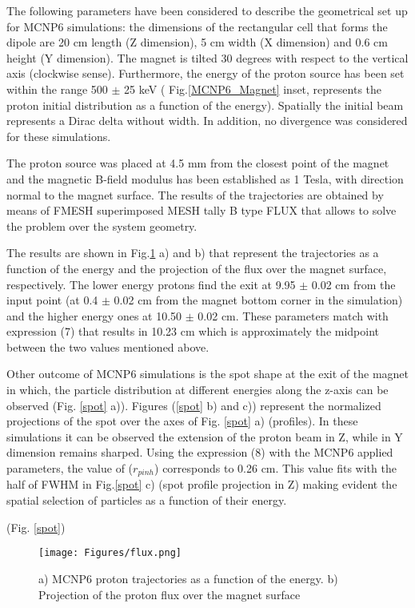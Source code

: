 \documentclass{cup-hpl}
\begin{document}
The following parameters have been considered to describe the geometrical set up for MCNP6 simulations: the dimensions of the rectangular cell that forms the dipole are 20 cm length (Z dimension), 5 cm width (X dimension) and 0.6 cm height (Y dimension). The magnet is tilted 30 degrees with respect to the vertical axis (clockwise sense). Furthermore, the energy of the proton source has been set within the range 500 $\pm$ 25 keV ( Fig.\ref{MCNP6_Magnet} inset, represents the proton initial distribution as a function of the energy). Spatially the initial beam represents a Dirac delta without width. In addition, no divergence was considered for these simulations.  

The proton source was placed at 4.5 mm from the closest point of the magnet and the magnetic B-field modulus has been established as 1 Tesla, with direction normal to the magnet surface. The results of the trajectories are obtained by means of FMESH superimposed MESH tally B type FLUX \cite{osti_1169677} that allows to solve the problem over the system geometry. 

The results are shown in Fig.\ref{flux} a) and b) that represent the trajectories as a function of the energy and the projection of the flux over the magnet surface, respectively. The lower energy protons find the exit at 9.95 $\pm$ 0.02 cm from the input point (at 0.4 $\pm$ 0.02 cm from the magnet bottom corner in the simulation) and the higher energy ones at 10.50 $\pm$ 0.02 cm. These parameters match with expression (7) that results in 10.23 cm which is approximately the midpoint between the two values mentioned above.

Other outcome of MCNP6 simulations is the spot shape at the exit of the magnet in which, the particle distribution at different energies along the z-axis can be observed (Fig. \ref{spot} a)). Figures (\ref{spot} b) and c)) represent the normalized projections of the spot over the axes of Fig. \ref{spot} a) (profiles). In these simulations it can be observed the extension of the proton beam in Z, while in Y dimension remains sharped. Using the expression (8) with the MCNP6 applied parameters, the value of ($r_{pinh}$) corresponds to 0.26 cm. This value fits with the half of FWHM in Fig.\ref{spot} c) (spot profile projection in Z) making evident the spatial selection of particles as a function of their energy.

(Fig. \ref{spot})


\begin{figure}[t]
	\centering
		\texttt{[image: Figures/flux.png]}%
	\caption{a) MCNP6 proton trajectories as a function of the energy. b) Projection of the proton flux over the magnet surface}
\label{flux}
\end{figure}
\end{document}
